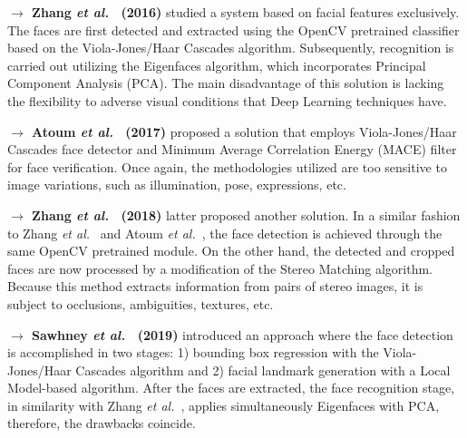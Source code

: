 \documentclass[class=report, crop=false, a4paper, 12pt]{standalone}
\begin{document}
\vspace{0.7\baselineskip}
\noindent\textbf{$\rightarrow$ Zhang \textit{et al.}~\autocite{zhangVirtualLaboratorySystem2016} (2016)} studied a system based on facial features exclusively. The faces are first detected and extracted using the OpenCV pretrained classifier based on the Viola-Jones/Haar Cascades algorithm. Subsequently, recognition is carried out utilizing the Eigenfaces algorithm, which incorporates Principal Component Analysis (PCA). The main disadvantage of this solution is lacking the flexibility to adverse visual conditions that Deep Learning techniques have.

\vspace{0.7\baselineskip}
\noindent\textbf{$\rightarrow$ Atoum \textit{et al.}~\autocite{atoumAutomatedOnlineExam2017} (2017)} proposed a solution that employs Viola-Jones/Haar Cascades face detector and Minimum Average Correlation Energy (MACE) filter for face verification. Once again, the methodologies utilized are too sensitive to image variations, such as illumination, pose, expressions, etc.

\vspace{0.7\baselineskip}
\noindent\textbf{$\rightarrow$ Zhang \textit{et al.}~\autocite{zhangVirtualProctorBiometric2018} (2018)} latter proposed another solution. In a similar fashion to Zhang \textit{et al.}~\autocite{zhangVirtualLaboratorySystem2016} and Atoum \textit{et al.}~\autocite{atoumAutomatedOnlineExam2017}, the face detection is achieved through the same OpenCV pretrained module. On the other hand, the detected and cropped faces are now processed by a modification of the Stereo Matching algorithm. Because this method extracts information from pairs of stereo images, it is subject to occlusions, ambiguities, textures, etc.

\vspace{0.7\baselineskip}
\noindent\textbf{$\rightarrow$ Sawhney \textit{et al.}~\autocite{sawhneyRealTimeSmartAttendance2019} (2019)} introduced an approach where the face detection is accomplished in two stages: 1) bounding box regression with the Viola-Jones/Haar Cascades algorithm and 2) facial landmark generation with a Local Model-based algorithm. After the faces are extracted, the face recognition stage, in similarity with Zhang \textit{et al.}~\autocite{zhangVirtualLaboratorySystem2016}, applies simultaneously Eigenfaces with PCA, therefore, the drawbacks coincide.
\end{document}
